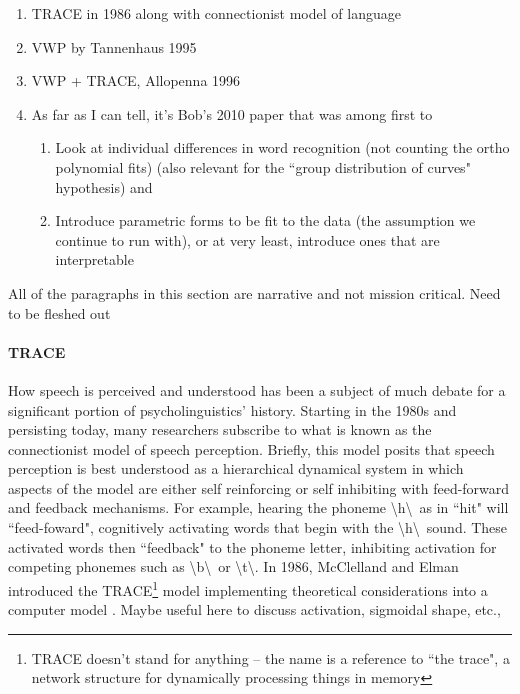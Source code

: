 \documentclass{article}
\begin{document}
\begin{singlespace}
\begin{enumerate}
\vspace{-2mm}
\item TRACE in 1986 along with connectionist model of language
\item VWP by Tannenhaus 1995
\item VWP + TRACE, Allopenna 1996
\item As far as I can tell, it's Bob's 2010 paper that was among first to 
\begin{enumerate}
\item Look at individual differences in word recognition (not counting the ortho polynomial fits) (also relevant for the ``group distribution of curves" hypothesis) and
\item Introduce parametric forms to be fit to the data (the assumption we continue to run with), or at very least, introduce ones that are interpretable
\end{enumerate}
\end{enumerate}
\end{singlespace}

All of the paragraphs in this section are narrative and not mission critical. Need to be fleshed out

\paragraph{TRACE } How speech is perceived and understood has been a subject of much debate for a significant portion of psycholinguistics' history. Starting in the 1980s and persisting today, many researchers subscribe to what is known as the connectionist model of speech perception. Briefly, this model posits that speech perception is best understood as a hierarchical dynamical system in which aspects of the model are either self reinforcing or self inhibiting with feed-forward and feedback mechanisms. For example, hearing the phoneme \textbackslash h\textbackslash  \ as in ``hit" will ``feed-foward", cognitively activating words that begin with the \textbackslash h\textbackslash \  sound. These activated words then ``feedback" to the phoneme letter, inhibiting activation for competing phonemes such as \textbackslash b\textbackslash \ or \textbackslash t\textbackslash. In 1986, McClelland and Elman introduced the TRACE\footnote{TRACE doesn't stand for anything -- the name is a reference to ``the trace", a network structure for dynamically processing things in memory} model implementing theoretical considerations into a computer model \cite{elman1985speech}. Maybe useful here to discuss activation, sigmoidal shape, etc., 
\end{document}
